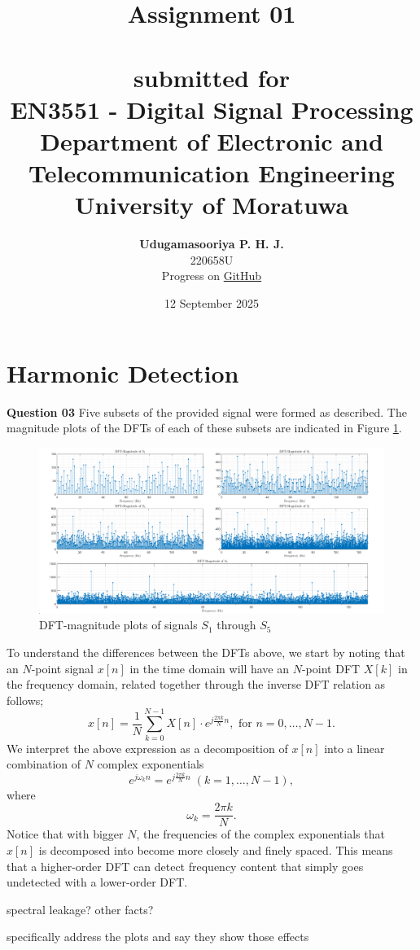 \documentclass{article}[a4paper]
\title{
	\huge{\textbf{
		Assignment 01
	}}\\
	\large{\phantom{}}\\
	\large{
		submitted for
	}\\
	\Large{
		\textbf{EN3551 - Digital Signal Processing}
	}\\
	\large{
		Department of Electronic and Telecommunication Engineering
	}
	\\
	\large{University of Moratuwa}
}
\author{
	\textbf{Udugamasooriya P. H. J.}\\
	220658U\\
	\small{Progress on \href{https://github.com/pulasthi-u/en3150-assignment01}{GitHub \extlink}}
}
\date{12 September 2025}
\begin{document}
	\maketitle
	
	\section{Harmonic Detection}
	
	\textbf{Question 03} Five subsets of the provided signal were formed as described. The magnitude plots of the DFTs of each of these subsets are indicated in Figure \ref{subset_dfts}.
	
	\begin{figure}[H]
		\centering
		\includegraphics[width=\linewidth]{images/q1_3_1.png}
		\caption{DFT-magnitude plots of signals $S_1$ through $S_5$}
		\label{subset_dfts}
	\end{figure}
	
	To understand the differences between the DFTs above, we start by noting that an $N$-point signal $x[n]$ in the time domain will have an $N$-point DFT $X[k]$ in the frequency domain, related together through the inverse DFT relation as follows; \[
		x[n] = \dfrac{1}{N} \sum_{k=0}^{N-1} X[n] \cdot e^{j\frac{2\pi k}{N}n}, \text{ for } n = 0, \dots, N-1.
	\] We interpret the above expression as a decomposition of $x[n]$ into a linear combination of $N$ complex exponentials \[
		e^{j \omega_k n} = e^{j\frac{2\pi k}{N}n} \; (k = 1, \dots, N-1),
	\] where \[
		\omega_k = \frac{2\pi k}{N}.
	\] Notice that with bigger $N$, the frequencies of the complex exponentials that $x[n]$ is decomposed into become more closely and finely spaced. This means that a higher-order DFT can detect frequency content that simply goes undetected with a lower-order DFT.
	
	spectral leakage? other facts?
	
	specifically address the plots and say they show those effects
	
\end{document}
